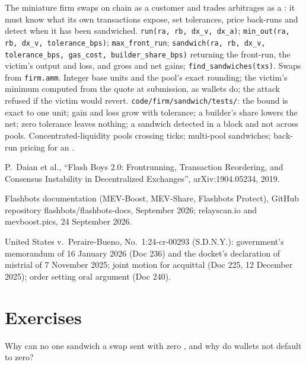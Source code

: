 \begin{build}
 The miniature firm swaps on chain as a customer and trades arbitrages as a : it must know what its own transactions expose,
set tolerances, price back-runs and detect when it has been sandwiched.
 \texttt{run(ra, rb, dx\_v, dx\_a)}; \texttt{min\_out(ra, rb, dx\_v, tolerance\_bps)}; \texttt{max\_front\_run}; \texttt{sandwich(ra,
rb, dx\_v, tolerance\_bps, gas\_cost, builder\_share\_bps)} returning the front-run, the victim's output and loss, and gross and net gains;
\texttt{find\_sandwiches(txs)}. Swaps from \texttt{firm.amm}.
 Integer base units and the pool's exact rounding; the victim's minimum computed from the quote at submission, as wallets do; the attack
refused if the victim would revert.
 \texttt{code/firm/sandwich/tests/}: the bound is exact to one unit; gain and loss grow with tolerance; a builder's share lowers
the net; zero tolerance leaves nothing; a sandwich detected in a block and not across pools.
 Concentrated-liquidity pools crossing ticks; multi-pool sandwiches; back-run pricing for an .
\end{build}

\begin{omsources}
\item P.~Daian et al., ``Flash Boys 2.0: Frontrunning, Transaction Reordering, and Consensus Instability in Decentralized Exchanges'',
arXiv:1904.05234, 2019.
\item Flashbots documentation (MEV-Boost, MEV-Share, Flashbots Protect), GitHub repository flashbots/flashbots-docs, September 2026; relayscan.io
and mevboost.pics, 24 September 2026.
\item United States v.\ Peraire-Bueno, No.\ 1:24-cr-00293 (S.D.N.Y.): government's memorandum of 16 January 2026 (Doc 236) and the docket's
declaration of mistrial of 7 November 2025; joint motion for acquittal (Doc 225, 12 December 2025); order setting oral argument (Doc 240).
\end{omsources}

\section{Exercises}

\begin{exercise}[$\star$]\label{exo:m3:maximal-extractable-value:1}
Why can no one sandwich a swap sent with zero , and why do wallets not default to zero?
\end{exercise}

